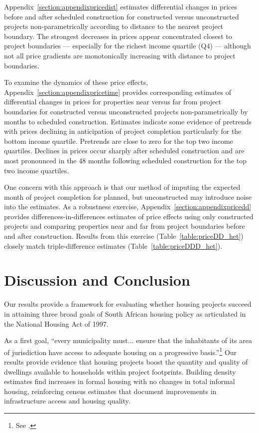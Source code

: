 \documentclass[12pt]{article}
\begin{document}
Appendix~\ref{section:appendixpricedist} estimates differential changes in prices before and after scheduled construction for constructed versus unconstructed projects non-parametrically according to distance to the nearest project boundary.  The strongest decreases in prices appear concentrated closest to project boundaries --- especially for the richest income quartile (Q4) --- although not all price gradients are monotonically increasing with distance to project boundaries.  

To examine the dynamics of these price effects, Appendix~\ref{section:appendixpricetime} provides corresponding estimates of differential changes in prices for properties near versus far from project boundaries for constructed versus unconstructed projects non-parametrically by months to scheduled construction.  Estimates indicate some evidence of pretrends with prices declining in anticipation of project completion particularly for the bottom income quartile.  Pretrends are close to zero for the top two income quartiles.  Declines in prices occur sharply after scheduled construction and are most pronounced in the 48 months following scheduled construction for the top two income quartiles.

One concern with this approach is that our method of imputing the expected month of project completion for planned, but unconstructed  may introduce noise into the estimates.  As a robustness exercise, Appendix~\ref{section:appendixpricedd} provides differences-in-differences estimates of price effects using only constructed projects and comparing properties near and far from project boundaries before and after construction.  Results from this exercise (Table~\ref{table:priceDD_het}) closely match triple-difference estimates (Table~\ref{table:priceDDD_het}).




\section{Discussion and Conclusion}\label{section:discussion}


Our results provide a framework for evaluating whether housing projects succeed in attaining three broad goals of South African housing policy as articulated in the National Housing Act of 1997.

As a first goal, ``every municipality must... ensure that the inhabitants of its area of jurisdiction have access to adequate housing on a progressive basis.''\footnote{See \cite{housingact}.}  Our results provide evidence that housing projects boost the quantity and quality of dwellings available to households within project footprints.  Building density estimates find increases in formal housing with no changes in total informal housing, reinforcing census estimates that document improvements in infrastructure access and housing quality.
\end{document}
